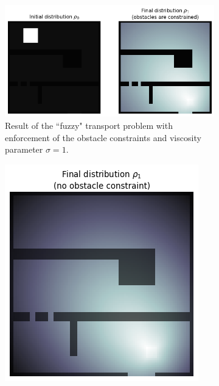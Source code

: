 \documentclass[../report.tex]{subfiles}
\begin{document}
\begin{figure}
	\centering
	\begin{subfigure}{.75\linewidth}
	\includegraphics[width=\linewidth]{../project/images/fuzzy_transport_withobstacle.png}
	\caption{Result of the ``fuzzy" transport problem with enforcement of the obstacle constraints and viscosity parameter $\sigma=1$.}\label{fig:2MargFuzzyTransportObstacles}
	\end{subfigure}
	\begin{subfigure}[t]{.38\linewidth}
	\centering
	\includegraphics[width=\linewidth]{../project/images/fuzzy_transport_noobstacle.png}

\end{subfigure}
\end{figure}
\end{document}
